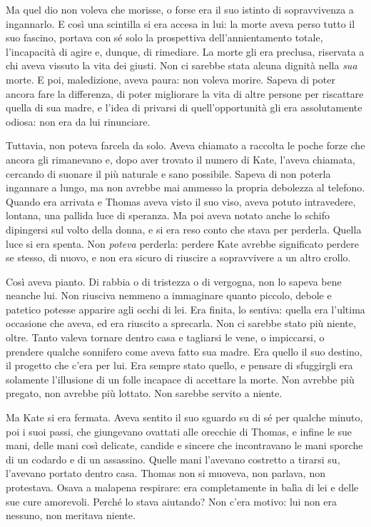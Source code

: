 \documentclass[a4paper,oneside,11pt]{memoir}
\begin{document}
Ma quel dio non voleva che morisse, o forse era il suo istinto di sopravvivenza a ingannarlo. E così una scintilla si
era accesa in lui: la morte aveva perso tutto il suo fascino, portava con sé solo la prospettiva dell'annientamento
totale, l'incapacità di agire e, dunque, di rimediare. La morte gli era preclusa, riservata a chi aveva vissuto la vita
dei giusti. Non ci sarebbe stata alcuna dignità nella \emph{sua} morte. E poi, maledizione, aveva paura: non voleva
morire. Sapeva di poter ancora fare la differenza, di poter migliorare la vita di altre persone per riscattare quella di
sua madre, e l'idea di privarsi di quell'opportunità gli era assolutamente odiosa: non era da lui rinunciare.

Tuttavia, non poteva farcela da solo. Aveva chiamato a raccolta le poche forze che ancora gli rimanevano e, dopo aver
trovato il numero di Kate, l'aveva chiamata, cercando di suonare il più naturale e sano possibile. Sapeva di non poterla
ingannare a lungo, ma non avrebbe mai ammesso la propria debolezza al telefono. Quando era arrivata e Thomas aveva visto
il suo viso, aveva potuto intravedere, lontana, una pallida luce di speranza. Ma poi aveva notato anche lo schifo
dipingersi sul volto della donna, e si era reso conto che stava per perderla. Quella luce si era spenta. Non
\emph{poteva} perderla: perdere Kate avrebbe significato perdere se stesso, di nuovo, e non era sicuro di riuscire a
sopravvivere a un altro crollo.

Così aveva pianto. Di rabbia o di tristezza o di vergogna, non lo sapeva bene neanche lui. Non riusciva nemmeno a
immaginare quanto piccolo, debole e patetico potesse apparire agli occhi di lei. Era finita, lo sentiva: quella era
l'ultima occasione che aveva, ed era riuscito a sprecarla. Non ci sarebbe stato più niente, oltre. Tanto valeva
tornare dentro casa e tagliarsi le vene, o impiccarsi, o prendere qualche sonnifero come aveva fatto sua madre. Era
quello il suo destino, il progetto che c'era per lui. Era sempre stato quello, e pensare di sfuggirgli era solamente
l'illusione di un folle incapace di accettare la morte. Non avrebbe più pregato, non avrebbe più lottato. Non sarebbe
servito a niente.

Ma Kate si era fermata. Aveva sentito il suo sguardo su di sé per qualche minuto, poi i suoi passi, che giungevano
ovattati alle orecchie di Thomas, e infine le sue mani, delle mani così delicate, candide e sincere che incontravano
le mani sporche di un codardo e di un assassino. Quelle mani l'avevano costretto a tirarsi su, l'avevano portato dentro
casa. Thomas non si muoveva, non parlava, non protestava. Osava a malapena respirare: era completamente in balìa di lei
e delle sue cure amorevoli. Perché lo stava aiutando? Non c'era motivo: lui non era nessuno, non meritava niente.
\end{document}
